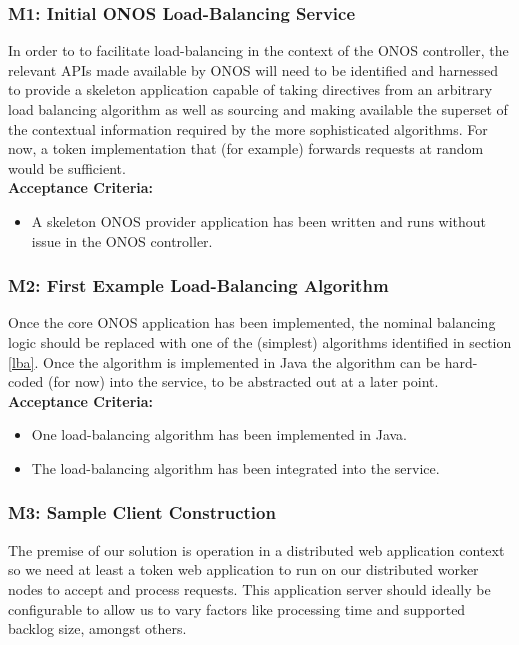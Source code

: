 \subsubsection{M1: Initial ONOS Load-Balancing Service}
In order to to facilitate load-balancing in the context of the ONOS controller, the relevant APIs made available by ONOS will need to be identified and harnessed to provide a skeleton application capable of taking directives from an arbitrary load balancing algorithm as well as sourcing and making available the superset of the contextual information required by the more sophisticated algorithms. For now, a token implementation that (for example) forwards requests at random would be sufficient. \\

\textbf{Acceptance Criteria:}
\begin{itemize}
    \item A skeleton ONOS provider application has been written and runs without issue in the ONOS controller.
\end{itemize}

\subsubsection{M2: First Example Load-Balancing Algorithm}
Once the core ONOS application has been implemented, the nominal balancing logic should be replaced with one of the (simplest) algorithms identified in section \ref{lba}. Once the algorithm is implemented in Java the algorithm can be hard-coded (for now) into the service, to be abstracted out at a later point. \\

\textbf{Acceptance Criteria:}
\begin{itemize}
    \item One load-balancing algorithm has been implemented in Java.
    \item The load-balancing algorithm has been integrated into the service.
\end{itemize}

\subsubsection{M3: Sample Client Construction}
The premise of our solution is operation in a distributed web application context so we need at least a token web application to run on our distributed worker nodes to accept and process requests. This application server should ideally be configurable to allow us to vary factors like processing time and supported backlog size, amongst others. \\

